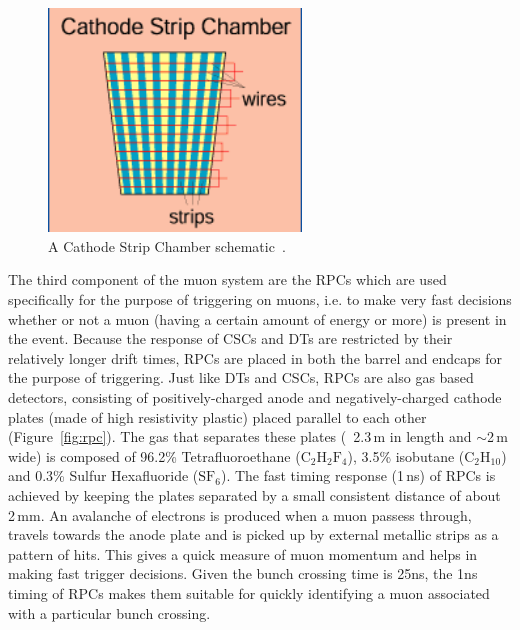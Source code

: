 \begin{figure}
\begin{center}
  \includegraphics[width=0.6\textwidth,keepaspectratio]{plots_and_figures/chapter3/CSC.png}
\caption{A Cathode Strip Chamber schematic~\cite{muon2}.}
\label{fig:csc}
\end{center}
\end{figure}

The third component of the muon system are the RPCs which are used specifically for the purpose of triggering on muons, i.e. to make very fast decisions whether or not a muon (having a certain amount of energy or more) is present in the event. Because the response of CSCs and DTs are restricted by their relatively longer drift times, RPCs are placed in both the barrel and endcaps for the purpose of triggering. Just like DTs and CSCs, RPCs are also gas based detectors, consisting of positively-charged anode and negatively-charged cathode plates (made of high resistivity plastic) placed parallel to each other (Figure~\ref{fig:rpc}). The gas that separates these plates (~2.3\,m in length and $\sim$2\,m wide) is composed of 96.2\% Tetrafluoroethane ($\mathrm{C}_{2}\mathrm{H}_{2}\mathrm{F}_{4}$), 3.5\% isobutane ($\mathrm{C}_{2}\mathrm{H}_{10}$) and 0.3\% Sulfur Hexafluoride ($\mathrm{S}\mathrm{F}_{6}$). The fast timing response (1\,ns) of RPCs is achieved by keeping the plates separated by a small consistent distance of about 2\,mm. An avalanche of electrons is produced  when a muon passess through, travels towards the anode plate and is picked up by external metallic strips as a pattern of hits. This gives a quick measure of muon momentum and helps in making fast trigger decisions. Given the bunch crossing time is 25ns, the 1ns timing of RPCs makes them suitable for quickly identifying a muon associated with a particular bunch crossing.      

